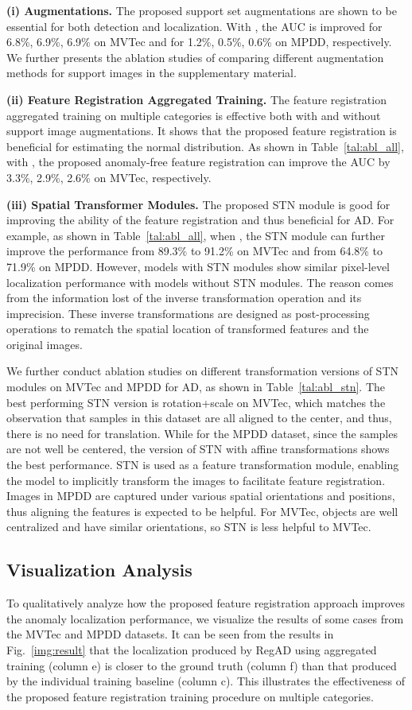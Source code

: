 \documentclass[runningheads]{llncs}
\begin{document}
\textbf{(i) Augmentations.} The proposed support set augmentations are shown to be essential for both detection and localization. With , the AUC is improved for 6.8\%, 6.9\%, 6.9\% on MVTec and for 1.2\%, 0.5\%, 0.6\% on MPDD, respectively. We further presents the ablation studies of comparing different augmentation methods for support images in the supplementary material.

\textbf{(ii) Feature Registration Aggregated Training.} The feature registration aggregated training on multiple categories is effective both with and without support image augmentations. It shows that the proposed feature registration is beneficial for estimating the normal distribution. As shown in Table~\ref{tal:abl_all}, with , the proposed anomaly-free feature registration can improve the AUC by 3.3\%, 2.9\%, 2.6\% on MVTec, respectively.

\textbf{(iii) Spatial Transformer Modules.} The proposed STN module is good for improving the ability of the feature registration and thus beneficial for AD. For example, as shown in Table~\ref{tal:abl_all}, when , the STN module can further improve the performance from 89.3\% to 91.2\% on MVTec and from 64.8\% to 71.9\% on MPDD. However, models with STN modules show similar pixel-level localization performance with models without STN modules. The reason comes from the information lost of the inverse transformation operation and its imprecision. These inverse transformations are designed as post-processing operations to rematch the spatial location of transformed features and the original images.

We further conduct ablation studies on different transformation versions of STN modules on MVTec and MPDD for AD, as shown in Table~\ref{tal:abl_stn}. The best performing STN version is rotation+scale on MVTec, which matches the observation that samples in this dataset are all aligned to the center, and thus, there is no need for translation. While for the MPDD dataset, since the samples are not well be centered, the version of STN with affine transformations shows the best performance. STN is used as a feature transformation module, enabling the model to implicitly transform the images to facilitate feature registration. Images in MPDD are captured under various spatial orientations and positions, thus aligning the features is expected to be helpful. For MVTec, objects are well centralized and have similar orientations, so STN is less helpful to MVTec.

\subsection{Visualization Analysis}
To qualitatively analyze how the proposed feature registration approach improves the anomaly localization performance, we visualize the results of some cases from the MVTec and MPDD datasets. It can be seen from the results in Fig.~\ref{img:result} that the localization produced by RegAD using aggregated training (column e) is closer to the ground truth (column f) than that produced by the individual training baseline (column c). This illustrates the effectiveness of the proposed feature registration training procedure on multiple categories.
\end{document}
